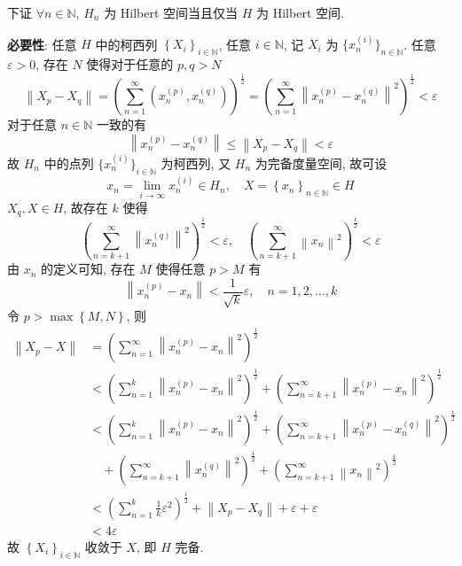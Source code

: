\documentclass[../main.tex]{subfiles}
\begin{document}
下证 $\forall n \in \mathbb{N}$, $H_n$ 为 Hilbert 空间当且仅当 $H$ 为 Hilbert 空间.

\noindent \textbf{必要性}:
任意 $H$ 中的柯西列 $\left\{ X_i \right\}_{i \in \mathbb{N}}$,
任意 $i \in \mathbb{N}$, 记 $X_i $ 为 $\{ x_n^{\left( i \right)} \}_{n \in \mathbb{N}}$.
任意 $\varepsilon > 0$, 存在 $N$ 使得对于任意的 $p, q> N$
\[
    \left\| X_p - X_q \right\|
    = \left( \sum_{n = 1}^{\infty} \left( x_n^{\left( p \right)}, x_n^{\left( q \right)} \right) \right)^{\frac{1}{2}}
    = \left( \sum_{n = 1}^{\infty} \left\| x_n^{\left( p \right)} - x_n^{\left( q \right)} \right\|^2 \right)^{\frac{1}{2}}
    < \varepsilon
\]
对于任意 $n \in \mathbb{N}$ 一致的有
\[
    \left\| x_n^{\left( p \right)} - x_n^{\left( q \right)} \right\| \leqslant \left\| X_p - X_q \right\| < \varepsilon
\]
故 $H_n$ 中的点列 $\{ x_n^{\left( i \right)} \}_{i \in \mathbb{N}}$ 为柯西列,
又 $H_n$ 为完备度量空间, 故可设
\[
    x_n = \lim_{i \to \infty} x_n^{\left( i \right)}\in H_n
    , \quad
    X = \left\{ x_n \right\}_{n \in \mathbb{N}} \in H
\]
$X_q, X \in H$, 故存在 $k$ 使得
\[
    \left( \sum_{n = k + 1}^{\infty} \left\| x_n^{\left( q \right)} \right\|^2 \right)^{\frac{1}{2}} < \varepsilon
    , \quad
    \left( \sum_{n = k + 1}^{\infty} \left\| x_n \right\|^2 \right)^{\frac{1}{2}} < \varepsilon
\]
由 $x_n$ 的定义可知, 存在 $M$ 使得任意 $p > M$ 有
\[
    \left\| x_n^{\left( p \right)} - x_n \right\| < \frac{1}{\sqrt{k}} \varepsilon
    , \quad
    n = 1, 2, \dots, k
\]
令 $p > \max \left\{ M, N \right\}$, 则
\begin{align*}
    \left\| X_p - X \right\|
    &= \left( \sum_{n = 1}^{\infty} \left\| x_n^{\left( p \right)} - x_n \right\|^2 \right)^{\frac{1}{2}} \\
    &< \left( \sum_{n = 1}^{k} \left\| x_n^{\left( p \right)} - x_n \right\|^2 \right)^{\frac{1}{2}}
        + \left( \sum_{n = k + 1}^{\infty} \left\| x_n^{\left( p \right)} - x_n \right\|^2 \right)^{\frac{1}{2}} \\
    &< \left( \sum_{n = 1}^{k} \left\| x_n^{\left( p \right)} - x_n \right\|^2 \right)^{\frac{1}{2}}
        + \left( \sum_{n = k + 1}^{\infty} \left\| x_n^{\left( p \right)} - x_n^{\left( q \right)} \right\|^2 \right)^{\frac{1}{2}} \\
    &\quad + \left( \sum_{n = k + 1}^{\infty} \left\| x_n^{\left( q \right)} \right\|^2 \right)^{\frac{1}{2}}
        + \left( \sum_{n = k + 1}^{\infty} \left\| x_n \right\|^2 \right)^{\frac{1}{2}} \\
    &< \left( \sum_{n = 1}^{k} \frac{1}{k} \varepsilon^2 \right)^{\frac{1}{2}} + \left\| X_p - X_q \right\| + \varepsilon + \varepsilon \\
    &< 4 \varepsilon
\end{align*}
故 $\left\{ X_i \right\}_{i \in \mathbb{N}}$ 收敛于 $X$, 即 $H$ 完备.
\end{document}

